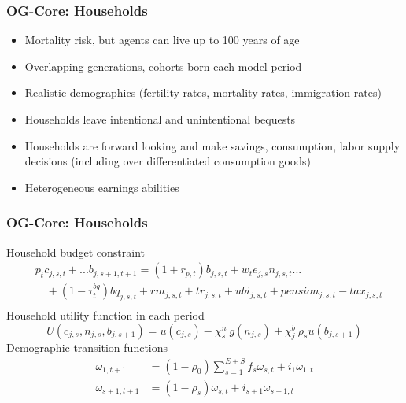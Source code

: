 \documentclass{beamer}
\begin{document}
  \begin{frame}
    \frametitle{OG-Core: Households}
    \begin{itemize}
      \item Mortality risk, but agents can live up to 100 years of age
      \vspace{2mm}
      \item Overlapping generations, cohorts born each model period
      \vspace{2mm}
      \item Realistic demographics (fertility rates, mortality rates, immigration rates)
      \vspace{2mm}
      \item Households leave intentional and unintentional bequests
      \vspace{2mm}
      \item Households are forward looking and make savings, consumption, labor supply decisions (including over differentiated consumption goods)
      \vspace{2mm}
      \item Heterogeneous earnings abilities
    \end{itemize}
  \end{frame}

  \begin{frame}
    \frametitle{OG-Core: Households}
    Household budget constraint
    \begin{equation*}
      \begin{split}
        &p_t c_{j,s,t} + ... b_{j,s+1,t+1} = (1 + r_{p,t})b_{j,s,t} + w_t e_{j,s} n_{j,s,t} ... \\
        &\quad + (1-\tau^{bq}_t)bq_{j,s,t} + rm_{j,s,t} + tr_{j,s,t} + ubi_{j,s,t} + pension_{j,s,t} - tax_{j,s,t}  \\
      \end{split}
    \end{equation*}
    Household utility function in each period
    \begin{equation*}
      U(c_{j,s},n_{j,s},b_{j,s+1}) = u(c_{j,s}) - \chi^n_s\:g(n_{j,s}) + \chi^b_j\:\rho_s u(b_{j,s+1})
    \end{equation*}
    Demographic transition functions
    \begin{align*}
      \omega_{1,t+1} &= (1 - \rho_0)\sum_{s=1}^{E+S} f_s\omega_{s,t} + i_1\omega_{1,t} \\
      \omega_{s+1,t+1} &= (1 - \rho_s)\omega_{s,t} + i_{s+1}\omega_{s+1,t}
    \end{align*}
  \end{frame}
\end{document}
